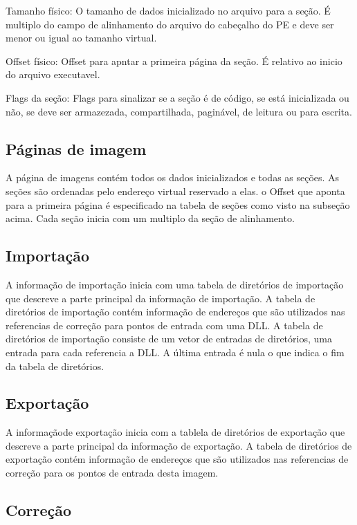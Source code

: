 Tamanho físico: O tamanho de dados inicializado no arquivo para a
seção. É multiplo do campo de alinhamento do arquivo do cabeçalho
do PE e deve ser menor ou igual ao tamanho virtual.


Offset físico: Offset para apntar a primeira página da seção. É relativo
ao inicio do arquivo executavel.


Flags da seção: Flags para sinalizar se a seção é de código, se está
inicializada ou não, se deve ser armazezada, compartilhada, paginável,
de leitura ou para escrita.


\subsection{Páginas de imagem}


A página de imagens contém todos os dados inicializados e todas as
seções. As seções são ordenadas pelo endereço virtual reservado a
elas. o Offset que aponta para a primeira página é especificado na
tabela de seções como visto na subseção acima. Cada seção inicia com
um multiplo da seção de alinhamento.


\subsection{Importação}


A informação de importação inicia com uma tabela de diretórios de
importação que descreve a parte principal da informação de importação.
A tabela de diretórios de importação contém informação de endereços
que são utilizados nas referencias de correção para pontos de entrada
com uma DLL. A tabela de diretórios de importação consiste de um vetor
de entradas de diretórios, uma entrada para cada referencia a DLL.
A última entrada é nula o que indica o fim da tabela de diretórios.


\subsection{Exportação}


A informaçãode exportação inicia com a tablela de diretórios de exportação
que descreve a parte principal da informação de exportação. A tabela
de diretórios de exportação contém informação de endereços que são
utilizados nas referencias de correção para os pontos de entrada desta
imagem.


\subsection{Correção}


